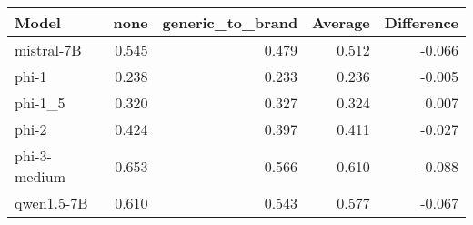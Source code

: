 \begin{tabular}{lrrrr}
\toprule
Model & none & generic_to_brand & Average & Difference \\
\midrule
mistral-7B & 0.545 & 0.479 & 0.512 & -0.066 \\
phi-1 & 0.238 & 0.233 & 0.236 & -0.005 \\
phi-1_5 & 0.320 & 0.327 & 0.324 & 0.007 \\
phi-2 & 0.424 & 0.397 & 0.411 & -0.027 \\
phi-3-medium & 0.653 & 0.566 & 0.610 & -0.088 \\
qwen1.5-7B & 0.610 & 0.543 & 0.577 & -0.067 \\
\bottomrule
\end{tabular}
